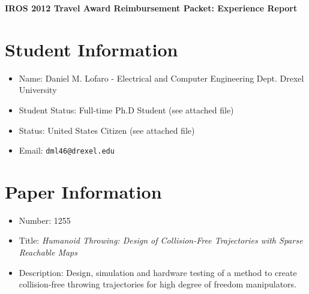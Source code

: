 \documentclass[11pt,a4paper,oneside]{report}
\begin{document}
\begin{center}
\LARGE{ \bf IROS 2012 Travel Award Reimbursement Packet: Experience Report }
\end{center}

\section*{Student Information}
\begin{itemize}
\item Name: Daniel M. Lofaro - Electrical and Computer Engineering Dept. Drexel University
\item Student Status: Full-time Ph.D Student (see attached file)
\item Status: United States Citizen (see attached file)
\item Email: \tt{dml46@drexel.edu}
\end{itemize}


\section*{Paper Information}
\begin{itemize}
\item Number: 1255
\item Title: \textit{Humanoid Throwing: Design of Collision-Free Trajectories with Sparse Reachable Maps}
\item Description: Design, simulation and hardware testing of a method to create collision-free throwing trajectories for high degree of freedom manipulators. 
\end{itemize}
\end{document}
